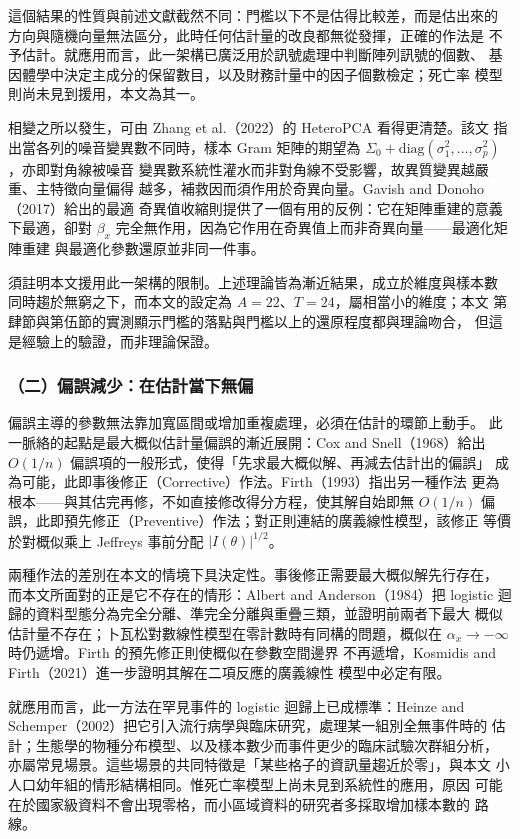 \documentclass[UTF8, fontset=macnew, a4paper, 12pt]{ctexart}
\begin{document}
這個結果的性質與前述文獻截然不同：門檻以下不是估得比較差，而是估出來的
方向與隨機向量無法區分，此時任何估計量的改良都無從發揮，正確的作法是
不予估計。就應用而言，此一架構已廣泛用於訊號處理中判斷陣列訊號的個數、
基因體學中決定主成分的保留數目，以及財務計量中的因子個數檢定；死亡率
模型則尚未見到援用，本文為其一。

相變之所以發生，可由 Zhang et al.（2022）的 HeteroPCA 看得更清楚。該文
指出當各列的噪音變異數不同時，樣本 Gram 矩陣的期望為
$\Sigma_0+\mathrm{diag}(\sigma_1^2,\dots,\sigma_p^2)$，亦即對角線被噪音
變異數系統性灌水而非對角線不受影響，故異質變異越嚴重、主特徵向量偏得
越多，補救因而須作用於奇異向量。Gavish and Donoho（2017）給出的最適
奇異值收縮則提供了一個有用的反例：它在矩陣重建的意義下最適，卻對
$\beta_x$ 完全無作用，因為它作用在奇異值上而非奇異向量——最適化矩陣重建
與最適化參數還原並非同一件事。

須註明本文援用此一架構的限制。上述理論皆為漸近結果，成立於維度與樣本數
同時趨於無窮之下，而本文的設定為 $A=22$、$T=24$，屬相當小的維度；本文
第肆節與第伍節的實測顯示門檻的落點與門檻以上的還原程度都與理論吻合，
但這是經驗上的驗證，而非理論保證。

\subsubsection{（二）偏誤減少：在估計當下無偏}

偏誤主導的參數無法靠加寬區間或增加重複處理，必須在估計的環節上動手。
此一脈絡的起點是最大概似估計量偏誤的漸近展開：Cox and Snell（1968）給出
$O(1/n)$ 偏誤項的一般形式，使得「先求最大概似解、再減去估計出的偏誤」
成為可能，此即事後修正（Corrective）作法。Firth（1993）指出另一種作法
更為根本——與其估完再修，不如直接修改得分方程，使其解自始即無 $O(1/n)$
偏誤，此即預先修正（Preventive）作法；對正則連結的廣義線性模型，該修正
等價於對概似乘上 Jeffreys 事前分配 $|I(\theta)|^{1/2}$。

兩種作法的差別在本文的情境下具決定性。事後修正需要最大概似解先行存在，
而本文所面對的正是它不存在的情形：Albert and Anderson（1984）把 logistic
迴歸的資料型態分為完全分離、準完全分離與重疊三類，並證明前兩者下最大
概似估計量不存在；卜瓦松對數線性模型在零計數時有同構的問題，概似在
$\alpha_x\to-\infty$ 時仍遞增。Firth 的預先修正則使概似在參數空間邊界
不再遞增，Kosmidis and Firth（2021）進一步證明其解在二項反應的廣義線性
模型中必定有限。

就應用而言，此一方法在罕見事件的 logistic 迴歸上已成標準：Heinze and
Schemper（2002）把它引入流行病學與臨床研究，處理某一組別全無事件時的
估計；生態學的物種分布模型、以及樣本數少而事件更少的臨床試驗次群組分析，
亦屬常見場景。這些場景的共同特徵是「某些格子的資訊量趨近於零」，與本文
小人口幼年組的情形結構相同。惟死亡率模型上尚未見到系統性的應用，原因
可能在於國家級資料不會出現零格，而小區域資料的研究者多採取增加樣本數的
路線。
\end{document}

